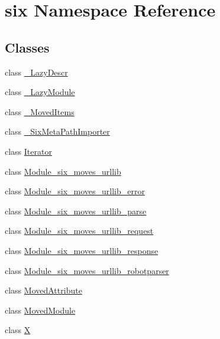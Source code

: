 \hypertarget{namespacesix}{}\section{six Namespace Reference}
\label{namespacesix}
\subsection*{Classes}
\begin{DoxyCompactItemize}
\item 
class \hyperlink{classsix_1_1___lazy_descr}{\+\_\+\+Lazy\+Descr}
\item 
class \hyperlink{classsix_1_1___lazy_module}{\+\_\+\+Lazy\+Module}
\item 
class \hyperlink{classsix_1_1___moved_items}{\+\_\+\+Moved\+Items}
\item 
class \hyperlink{classsix_1_1___six_meta_path_importer}{\+\_\+\+Six\+Meta\+Path\+Importer}
\item 
class \hyperlink{classsix_1_1_iterator}{Iterator}
\item 
class \hyperlink{classsix_1_1_module__six__moves__urllib}{Module\+\_\+six\+\_\+moves\+\_\+urllib}
\item 
class \hyperlink{classsix_1_1_module__six__moves__urllib__error}{Module\+\_\+six\+\_\+moves\+\_\+urllib\+\_\+error}
\item 
class \hyperlink{classsix_1_1_module__six__moves__urllib__parse}{Module\+\_\+six\+\_\+moves\+\_\+urllib\+\_\+parse}
\item 
class \hyperlink{classsix_1_1_module__six__moves__urllib__request}{Module\+\_\+six\+\_\+moves\+\_\+urllib\+\_\+request}
\item 
class \hyperlink{classsix_1_1_module__six__moves__urllib__response}{Module\+\_\+six\+\_\+moves\+\_\+urllib\+\_\+response}
\item 
class \hyperlink{classsix_1_1_module__six__moves__urllib__robotparser}{Module\+\_\+six\+\_\+moves\+\_\+urllib\+\_\+robotparser}
\item 
class \hyperlink{classsix_1_1_moved_attribute}{Moved\+Attribute}
\item 
class \hyperlink{classsix_1_1_moved_module}{Moved\+Module}
\item 
class \hyperlink{classsix_1_1_x}{X}
\end{DoxyCompactItemize}
